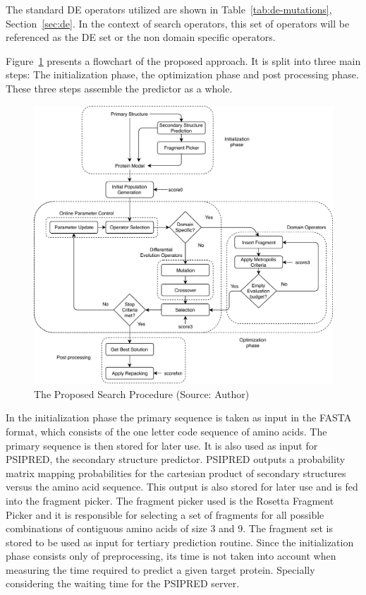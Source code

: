 The standard DE operators utilized are shown in Table~\ref{tab:de-mutations},
Section~\ref{sec:de}. In the context of search operators,
this set of operators will be referenced as
the DE set or the non domain specific operators.

Figure~\ref{fig:search-procedure} presents a flowchart of the proposed approach. It is split into three main steps: The initialization phase, the optimization
phase and post processing phase. These three steps assemble the predictor as a whole.

\begin{figure}
    \centering
    \includegraphics[width=\linewidth]{Figuras/search-procedure.pdf}
    \caption{The Proposed Search Procedure (Source: Author)}
    \label{fig:search-procedure}
\end{figure}

In the initialization phase the primary sequence is taken as input in the FASTA format,
which consists of the one letter code sequence of amino acids. The primary sequence
is then stored for later use. It is also used as input for PSIPRED, the 
secondary structure predictor. PSIPRED outputs a probability matrix mapping
probabilities for the cartesian product of secondary structures versus the amino acid
sequence. This output is also stored for later use and is fed into the fragment picker.
The fragment picker used is the Rosetta Fragment Picker and it is responsible for
selecting a set of fragments for all possible combinations of
contiguous amino acids of size 3 and 9. The fragment set is stored to be used as input
for tertiary prediction routine. Since the initialization phase consists only of
preprocessing, its time is not taken into account when measuring the time required
to predict a given target protein. Specially considering the waiting time for the
PSIPRED server.

